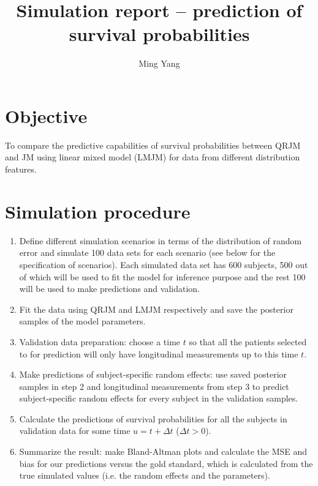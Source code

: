 \documentclass{article}
\begin{document}
\title{Simulation report -- prediction of survival probabilities}
\author{Ming Yang}
\maketitle

\section{Objective}
To compare the predictive capabilities of survival probabilities between QRJM and JM using linear mixed model (LMJM) for data from different distribution features.\par


\section{Simulation procedure}
\begin{enumerate}
\item  Define different simulation scenarios in terms of the distribution of random error and simulate 100 data sets for each scenario (see below for the specification of scenarios). Each simulated data set has 600 subjects, 500 out of which will be used to fit the model for inference purpose and the rest 100 will be used to make predictions and validation.
\item  Fit the data using QRJM and LMJM respectively and save the posterior samples of the model parameters.
\item  Validation data preparation: choose a time $t$ so that all the patients selected to for prediction will only have longitudinal measurements up to this time $t$.
\item  Make predictions of subject-specific random effects: use saved posterior samples in step 2 and longitudinal measurements from step 3 to predict subject-specific random effects for every subject in the validation samples.
\item  Calculate the predictions of survival probabilities for all the subjects in validation data for some time $u = t + \Delta t$ ($\Delta t > 0$).
\item Summarize the result: make Bland-Altman plots and calculate the MSE and bias for our predictions versus the gold standard, which is calculated from the true simulated values (i.e. the random effects and the parameters).
\end{enumerate}
\end{document}
